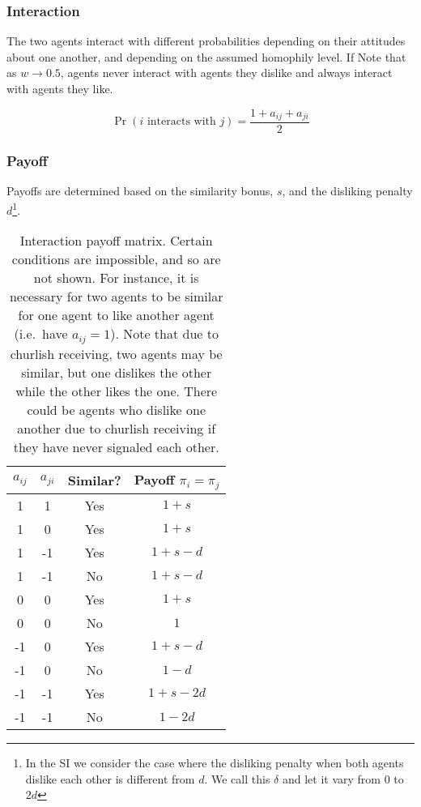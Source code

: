 \documentclass[11pt,letterpaper]{article}
\begin{document}
\subsubsection{Interaction}

The two agents interact with different probabilities
depending on their attitudes about one another, and depending on the 
assumed homophily level. If  Note that as $w \rightarrow 0.5$,
agents never interact with agents they dislike and always interact with 
agents they like.

\begin{equation}
  \Pr(\text{$i$ interacts with $j$}) = \frac{1 + a_{ij} + a_{ji}}{2}
\end{equation}
\noindent

\subsubsection{Payoff}

Payoffs are determined based on the similarity bonus, $s$, and the disliking
penalty $d$\footnote{In the SI we consider the case where the disliking penalty 
when both agents dislike each other is different from $d$. We call this $\delta$
and let it vary from 0 to $2d$}. 

\begin{table}[h]
  \centering
  \begin{tabular}{cccc}
    $a_{ij}$ & $a_{ji}$ & Similar? & Payoff $\pi_i = \pi_j$ \\
    \toprule
    1 & 1 & Yes & $1 + s$ \\
    1 & 0 & Yes & $1 + s$ \\
    1 & -1 & Yes & $1 + s - d$ \\
    1 & -1 & No & $1 + s - d$ \\
    0 & 0 & Yes & $1 + s$ \\
    0 & 0 & No & $1$ \\
    -1 & 0 & Yes & $1 + s - d$ \\
    -1 & 0 & No  & $1 - d$ \\
    -1 & -1 & Yes & $1 + s - 2d$ \\
    -1 & -1 & No  & $1 - 2d$ \\
  \end{tabular}
  \caption{Interaction payoff matrix. Certain conditions are impossible, and so are not
  shown. For instance, it is necessary for two agents to be similar for 
  one agent to like another agent (i.e.\ have $a_{ij} = 1$). Note that
  due to churlish receiving, two agents may be similar, but one dislikes the
  other while the other likes the one. There could be agents who dislike one
  another due to churlish receiving if they have never signaled each other.}
\end{table}
\end{document}
